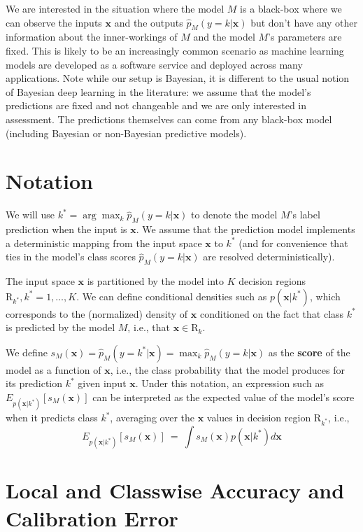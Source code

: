 \documentclass{article}
\newcommand{\ux}{{\mathbf{x}}}
\begin{document}
We are interested in the situation where the model $M$ is a black-box where we can observe the inputs $\ux$ and the outputs $\hat{p}_M(y = k | \ux)$ but don't have any other information about the inner-workings of $M$ and the model $M$'s parameters are fixed.
This is likely to be an increasingly common scenario as machine learning models are developed as a software service and deployed across many applications.
Note while our setup is Bayesian, it is different to the usual notion of Bayesian deep learning in the literature: we assume that the model's predictions are fixed and not changeable and we are only interested in assessment.
The predictions themselves can come from any black-box model (including Bayesian or non-Bayesian predictive models).

 
\section{Notation}

We will use $k^* = \arg \max_k \hat{p}_M(y = k | \ux)$ to denote the model $M$'s label prediction when the input is $\ux$.
We assume that the prediction model implements a deterministic mapping from the input space $\ux$ to $k^*$ (and for convenience that ties in the model's class scores $\hat{p}_M(y = k | \ux)$ are resolved deterministically).  

The input space $\ux$ is partitioned by the model into $K$ decision regions $\mbox{R}_{k^*},  k^* = 1,\ldots,K$.
We can define conditional densities such as $p(\ux | k^*)$, which corresponds to the (normalized) density of $\ux$ conditioned on the fact that class $k^*$ is predicted by the model $M$, i.e., that $\ux \in \mbox{R}_k$.


We define $s_M(\ux) = \hat{p}_M(y = k^*| \ux) = \max_k \hat{p}_M(y = k | \ux)$ as the {\bf score} of the model as a function of $\ux$, i.e., the class probability that the model produces for its prediction $k^*$  given input $\ux$.
Under this notation, an expression such as $E_{p(\ux | k^*)}[s_M(\ux)]$ can be interpreted as the expected value of the model's score when it predicts class $k^*$, averaging over the $\ux$ values in decision region $\mbox{R}_{k^*}$, i.e.,
\[
    E_{p(\ux | k^*)}[s_M(\ux)] \ = \ \int s_M(\ux) p(\ux | k^*) d\ux
\]


\section{Local and Classwise Accuracy and Calibration Error}  
\end{document}
